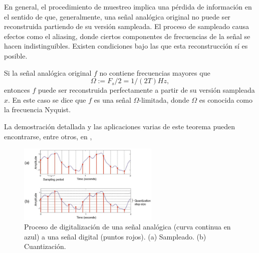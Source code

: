 \documentclass{article}
\begin{document}
En general, el procedimiento de muestreo implica una pérdida de información en el sentido de que, generalmente, una señal analógica original no puede ser reconstruida partiendo de su versión sampleada. El proceso de sampleado causa efectos como el aliasing, donde ciertos componentes de frecuencias de la señal se hacen indistinguibles. Existen condiciones bajo las que esta reconstrucción sí es posible.

\begin{theorem}
  Si la señal analógica original $f$ no contiene frecuencias mayores que 
  \begin{equation}
      \Omega:=F_s/2=1/(2T)Hz,
  \end{equation} 
  entonces $f$ puede ser reconstruida perfectamente a partir de su versión sampleada $x$. En este caso se dice que $f$ es una señal $\Omega$-limitada, donde $\Omega$ es conocida como la frecuencia Nyquist.
\end{theorem}

La demostración detallada y las aplicaciones varias de este teorema pueden encontrarse, entre otros, en \cite[Capítulo 2]{muller2015fundamentals}, \cite[Capítulo 4]{proakis1996digital}

\begin{figure}[H]
\centering
    \includegraphics[width=0.60\textwidth]{images/83.jpeg}
    \caption{Proceso de digitalización de una señal analógica (curva continua en azul) a una señal digital (puntos rojos). (a) Sampleado. (b) Cuantización. \cite[Capítulo 2]{muller2015fundamentals}}
  \label{fig:6.3}
\end{figure}
\end{document}
